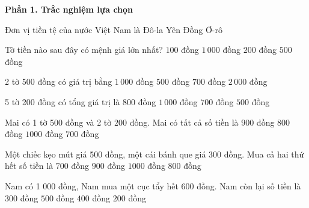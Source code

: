 \textbf{Phần 1. Trắc nghiệm lựa chọn}

\begin{ex} %
Đơn vị tiền tệ của nước Việt Nam là
\choice
{Đô-la}
{Yên}
{\True Đồng}
{Ơ-rô}
\end{ex}

\begin{ex} %
Tờ tiền nào sau đây có mệnh giá lớn nhất?
\choice
{$100$ đồng}
{\True $1\,000$ đồng}
{$200$ đồng}
{$500$ đồng}
\end{ex}

\begin{ex} %
2 tờ 500 đồng có giá trị bằng
\choice
{\True $1\,000$ đồng}
{$500$ đồng}
{$700$ đồng}
{$2\,000$ đồng}
\end{ex}

\begin{ex} %
5 tờ 200 đồng có tổng giá trị là
\choice
{$800$ đồng}
{\True $1\,000$ đồng}
{$700$ đồng}
{$500$ đồng}
\end{ex}

\begin{ex} %
Mai có 1 tờ 500 đồng và 2 tờ 200 đồng. Mai có tất cả số tiền là
\choice
{\True $900$ đồng}
{$800$ đồng}
{$1000$ đồng}
{$700$ đồng}
\end{ex}

\begin{ex} %
Một chiếc kẹo mút giá 500 đồng, một cái bánh que giá 300 đồng. Mua cả hai thứ hết số tiền là
\choice
{$700$ đồng}
{$900$ đồng}
{$1000$ đồng}
{\True $800$ đồng}
\end{ex}

\begin{ex} %
Nam có 1 000 đồng, Nam mua một cục tẩy hết 600 đồng. Nam còn lại số tiền là
\choice
{$300$ đồng}
{$500$ đồng}
{\True $400$ đồng}
{$200$ đồng}
\end{ex}

